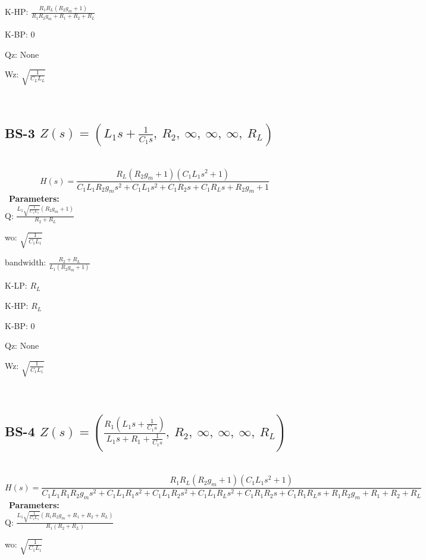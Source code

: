 \documentclass{article}
\begin{document}
K-HP: $\frac{R_{1} R_{L} \left(R_{2} g_{m} + 1\right)}{R_{1} R_{2} g_{m} + R_{1} + R_{2} + R_{L}}$\ 

K-BP: $0$\ 

Qz: $\text{None}$\ 

Wz: $\sqrt{\frac{1}{C_{L} L_{L}}}$\ 

\ 

\subsection{BS-3 $Z(s) = \left( L_{1} s + \frac{1}{C_{1} s}, \  R_{2}, \  \infty, \  \infty, \  \infty, \  R_{L}\right)$ } \ 
\textbf{\[H(s) = \frac{R_{L} \left(R_{2} g_{m} + 1\right) \left(C_{1} L_{1} s^{2} + 1\right)}{C_{1} L_{1} R_{2} g_{m} s^{2} + C_{1} L_{1} s^{2} + C_{1} R_{2} s + C_{1} R_{L} s + R_{2} g_{m} + 1}\] } \ 
\textbf{Parameters:}\\ 

Q: $\frac{L_{1} \sqrt{\frac{1}{C_{1} L_{1}}} \left(R_{2} g_{m} + 1\right)}{R_{2} + R_{L}}$\ 

wo: $\sqrt{\frac{1}{C_{1} L_{1}}}$\ 

bandwidth: $\frac{R_{2} + R_{L}}{L_{1} \left(R_{2} g_{m} + 1\right)}$\ 

K-LP: $R_{L}$\ 

K-HP: $R_{L}$\ 

K-BP: $0$\ 

Qz: $\text{None}$\ 

Wz: $\sqrt{\frac{1}{C_{1} L_{1}}}$\ 

\ 

\subsection{BS-4 $Z(s) = \left( \frac{R_{1} \left(L_{1} s + \frac{1}{C_{1} s}\right)}{L_{1} s + R_{1} + \frac{1}{C_{1} s}}, \  R_{2}, \  \infty, \  \infty, \  \infty, \  R_{L}\right)$ } \ 
\textbf{\[H(s) = \frac{R_{1} R_{L} \left(R_{2} g_{m} + 1\right) \left(C_{1} L_{1} s^{2} + 1\right)}{C_{1} L_{1} R_{1} R_{2} g_{m} s^{2} + C_{1} L_{1} R_{1} s^{2} + C_{1} L_{1} R_{2} s^{2} + C_{1} L_{1} R_{L} s^{2} + C_{1} R_{1} R_{2} s + C_{1} R_{1} R_{L} s + R_{1} R_{2} g_{m} + R_{1} + R_{2} + R_{L}}\] } \ 
\textbf{Parameters:}\\ 

Q: $\frac{L_{1} \sqrt{\frac{1}{C_{1} L_{1}}} \left(R_{1} R_{2} g_{m} + R_{1} + R_{2} + R_{L}\right)}{R_{1} \left(R_{2} + R_{L}\right)}$\ 

wo: $\sqrt{\frac{1}{C_{1} L_{1}}}$\ 
\end{document}
